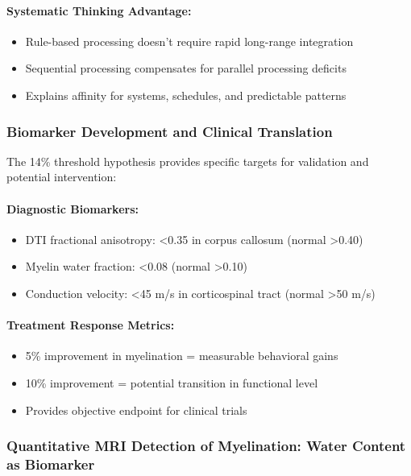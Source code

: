 \documentclass[11pt]{article}
\let\oldsubsubsection\subsubsection
\renewcommand{\subsubsection}[1]{\oldsubsubsection{#1}\setlength{\leftskip}{1.5em}}
\begin{document}
\paragraph{Systematic Thinking Advantage:}
\begin{itemize}
\item Rule-based processing doesn't require rapid long-range integration
\item Sequential processing compensates for parallel processing deficits
\item Explains affinity for systems, schedules, and predictable patterns
\end{itemize}

\subsubsection{Biomarker Development and Clinical Translation}

The 14\% threshold hypothesis provides specific targets for validation and potential intervention:

\paragraph{Diagnostic Biomarkers:}
\begin{itemize}
\item DTI fractional anisotropy: \textless0.35 in corpus callosum (normal \textgreater0.40)
\item Myelin water fraction: \textless0.08 (normal \textgreater0.10)
\item Conduction velocity: \textless45 m/s in corticospinal tract (normal \textgreater50 m/s)
\end{itemize}

\paragraph{Treatment Response Metrics:}
\begin{itemize}
\item 5\% improvement in myelination = measurable behavioral gains
\item 10\% improvement = potential transition in functional level
\item Provides objective endpoint for clinical trials
\end{itemize}

\subsubsection{Quantitative MRI Detection of Myelination: Water Content as Biomarker}
\end{document}
